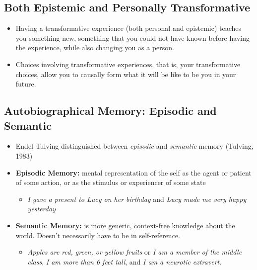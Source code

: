 \documentclass[
  .7em,
  letterpaper,
  DIV=11,
  numbers=noendperiod]{scrartcl}
\providecommand{\tightlist}{%
  \setlength{\itemsep}{0pt}\setlength{\parskip}{0pt}}\usepackage{longtable,booktabs,array}
\begin{document}
\hypertarget{both-epistemic-and-personally-transformative}{%
\subsection{Both Epistemic and Personally
Transformative}\label{both-epistemic-and-personally-transformative}}

\begin{itemize}
\tightlist
\item
  Having a transformative experience (both personal and epistemic)
  teaches you something new, something that you could not have known
  before having the experience, while also changing you as a person.
\item
  Choices involving transformative experiences, that is, your
  transformative choices, allow you to causally form what it will be
  like to be you in your future.
\end{itemize}

\hypertarget{autobiographical-memory-episodic-and-semantic}{%
\subsection{Autobiographical Memory: Episodic and
Semantic}\label{autobiographical-memory-episodic-and-semantic}}

\begin{itemize}
\item
  Endel Tulving distinguished between \emph{episodic} and
  \emph{semantic} memory (Tulving, 1983)
\item
  \textbf{Episodic Memory:} mental representation of the self as the
  agent or patient of some action, or as the stimulus or experiencer of
  some state

  \begin{itemize}
  \tightlist
  \item
    \emph{I gave a present to Lucy on her birthday} and \emph{Lucy made
    me very happy yesterday}
  \end{itemize}
\item
  \textbf{Semantic Memory:} is more generic, context-free knowledge
  about the world. Doesn't necessarily have to be in self-reference.

  \begin{itemize}
  \tightlist
  \item
    \emph{Apples are red, green, or yellow fruits} or \emph{I am a
    member of the middle class}, \emph{I am more than 6 feet tall}, and
    \emph{I am a neurotic extravert}.
  \end{itemize}
\end{itemize}
\end{document}

